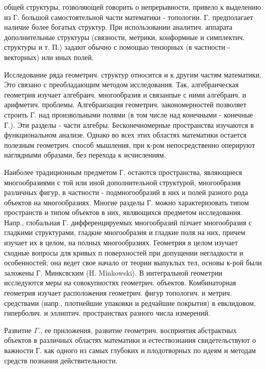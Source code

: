 \documentclass[10pt]{article}
\begin{document}
общей структуры, гозволяющей говорить о непрерывности, привело к выделению из Г. большой самостоятельной части математики - топологии. Г. предполагает наличие более богатых структур. При использовании аналитич. аппарата дополнительные структуры (связности, метрики, конформные и симплектич. структуры и т. П.) задают обычно с помощыо тензорных (в частности - векторных) или иных полей.



Исследование ряда геометрич. структур относится и к другим частям математики. Это связано с преобладающим методом исследования. Так, алгебраическая геометрия изучает алгебраич. многообразия и связанпые с ними алгебраич. и арифметич. проблемы. Алгебраизация геометрич. закономерностей позволяет строить Г. над произвольными полями (в том числе над конечными - конечные Г.). Эти разделы - части алгебры. Бесконечномерные пространства изучаются в функциональном анализе. Однако во всех этих областях математики остается полезным геометрич. способ мышления, при к-ром непосредственно оперируют наглядными образами, без перехода к исчислениям.



Наиболее традиционным предметом Г. остаются пространства, являющиеся многообразиями с той или иной дополнительной структурой, многообразия различных фигур, в частности - подмногообразий в них и полей разного рода объектов на многообразиях. Многие разделы Г. можно характеризовать типом пространств и типом объектов в них, являющихся предметом исследования. Напр., глобальная Г. дифференцируемых многообразий пізчает многообразия с гладкими структурами, гладкие многообразия и гладкие поля на них, причем изучает их в целом, на полных многообразиях. Геометрия в целом изучает сходные вопросы для кривых п поверхностей при допущении негладкости и особенностей; она ведет свое начало от теории выпуклых тел, основы к-рой были заложены Г. Минксвским (H. Minkowski). В интегральной геометрии исследуются меры на совокупностях геометрич. объектов. Комбинаторная геометрия изучает расположения геометрич. фигур топологич. и метрич. средствами (напр., плотнейшие упаковки и редчайшие покрытия) в евклидовом, гиперболич. и эллиптич. пространствах разного числа измерений.



Развитие $\Gamma$., ее приложения, развитие геометрич. восприятия абстрактных объектов в различных областях математики и естествознания свидетельствуют о важности Г. как одного из самых глубоких и плодотворных по идеям и методам средств познания действительности.
\end{document}
